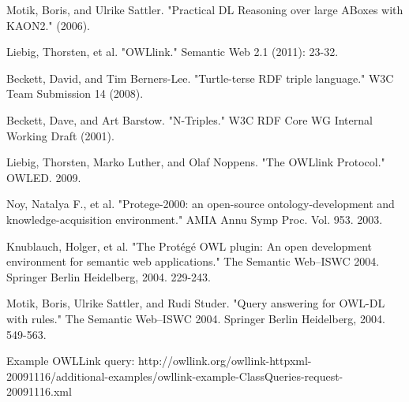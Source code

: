 \documentclass{article}
\begin{document}
\begin{thebibliography}{9}
  Motik, Boris, and Ulrike Sattler. "Practical DL Reasoning over large ABoxes
  with KAON2." (2006).

  Liebig, Thorsten, et al. "OWLlink." Semantic Web 2.1 (2011): 23-32.

  Beckett, David, and Tim Berners-Lee. "Turtle-terse RDF triple language." W3C
  Team Submission 14 (2008).

  Beckett, Dave, and Art Barstow. "N-Triples." W3C RDF Core WG Internal Working
  Draft (2001).

  Liebig, Thorsten, Marko Luther, and Olaf Noppens. "The OWLlink Protocol." OWLED.
2009.

Noy, Natalya F., et al. "Protege-2000: an open-source ontology-development and
knowledge-acquisition environment." AMIA Annu Symp Proc. Vol. 953. 2003.

Knublauch, Holger, et al. "The Protégé OWL plugin: An open development
environment for semantic web applications." The Semantic Web–ISWC 2004. Springer
Berlin Heidelberg, 2004. 229-243.

  Motik, Boris, Ulrike Sattler, and Rudi Studer. "Query answering for OWL-DL
  with rules." The Semantic Web–ISWC 2004. Springer Berlin Heidelberg, 2004.
  549-563.

Example OWLLink query:
http://owllink.org/owllink-httpxml-20091116/additional-examples/owllink-example-ClassQueries-request-20091116.xml

\end{thebibliography}
\end{document}
